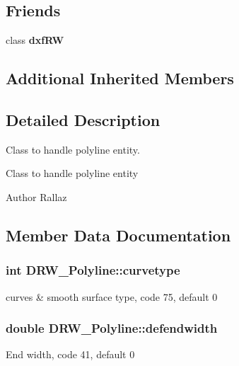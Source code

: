 \subsection*{Friends}
\begin{DoxyCompactItemize}
\item 
\hypertarget{class_d_r_w___polyline_a7f080e77e5112f8364c61b97387f8ee2}{}class {\bfseries dxf\+R\+W}\label{class_d_r_w___polyline_a7f080e77e5112f8364c61b97387f8ee2}

\end{DoxyCompactItemize}
\subsection*{Additional Inherited Members}


\subsection{Detailed Description}
Class to handle polyline entity. 

Class to handle polyline entity \begin{DoxyAuthor}{Author}
Rallaz 
\end{DoxyAuthor}


\subsection{Member Data Documentation}
\hypertarget{class_d_r_w___polyline_a9cd44431960f6b199c218da6ca475fdb}{}
\subsubsection[{curvetype}]{\setlength{\rightskip}{0pt plus 5cm}int D\+R\+W\+\_\+\+Polyline\+::curvetype}\label{class_d_r_w___polyline_a9cd44431960f6b199c218da6ca475fdb}
curves \& smooth surface type, code 75, default 0 \hypertarget{class_d_r_w___polyline_a8818ce849a6704cb7d83ba7792f3db50}{}
\subsubsection[{defendwidth}]{\setlength{\rightskip}{0pt plus 5cm}double D\+R\+W\+\_\+\+Polyline\+::defendwidth}\label{class_d_r_w___polyline_a8818ce849a6704cb7d83ba7792f3db50}
End width, code 41, default 0 \hypertarget{class_d_r_w___polyline_a47b35f26221533fdd0d7ef2d91925ca3}{}
